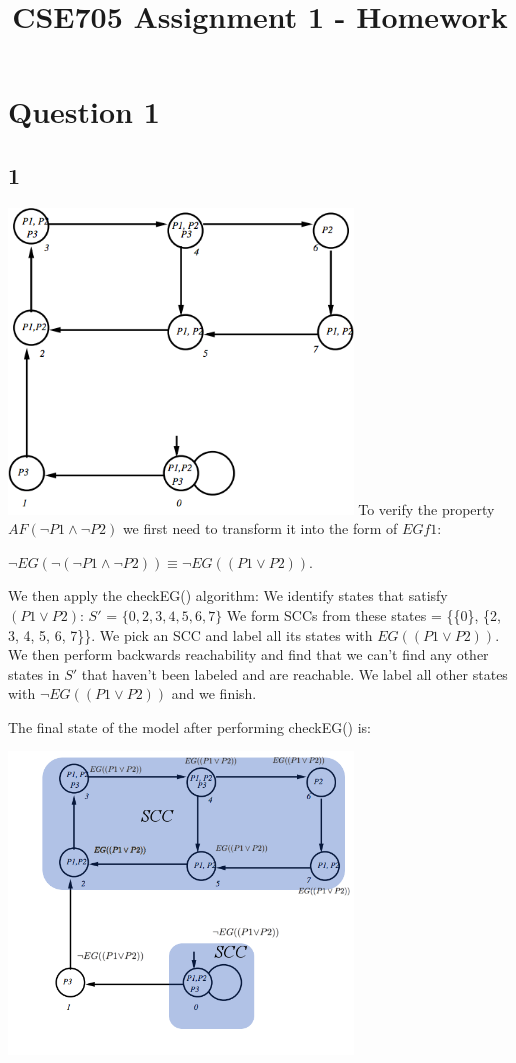 \documentclass{scrartcl}
\title{CSE705 Assignment 1 - Homework}
\begin{document}
\setcounter{secnumdepth}{0}
\setlength{\parskip}{10pt plus 1pt minus 1pt}

\section{Question 1}

\subsection{1}
\includegraphics[width=3.6in]{q1model}
\newline
To verify the property $AF(\neg P1 \wedge \neg P2)$ we first need to transform it into the form of $EGf1$:

$\neg EG(\neg ( \neg P1 \wedge \neg P2)) \equiv \neg EG((P1 \vee P2))$.

We then apply the checkEG() algorithm: We identify states that satisfy $(P1 \vee P2)$: $S'$ = $\{0, 2, 3, 4, 5, 6, 7\}$
We form SCCs from these states = \{\{0\}, \{2, 3, 4, 5, 6, 7\}\}.
We pick an SCC and label all its states with $EG((P1 \vee P2))$.
We then perform backwards reachability and find that we can't find any other states in $S'$ that haven't been labeled and are reachable.
We label all other states with $\neg EG((P1 \vee P2))$ and we finish.

The final state of the model after performing checkEG() is: 

\includegraphics[width=3.6in]{q1modelchecked}
\end{document}
